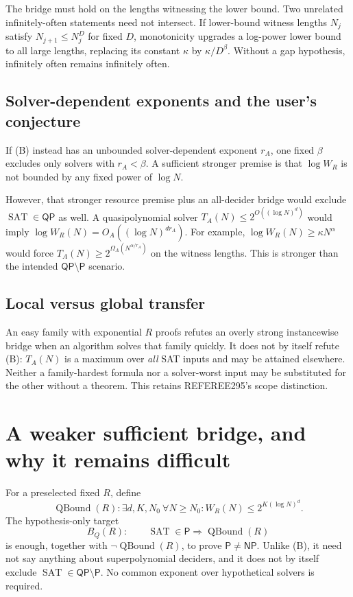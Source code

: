 \documentclass[11pt]{article}
\newcommand{\Pclass}{\mathsf P}
\newcommand{\NP}{\mathsf{NP}}
\newcommand{\QP}{\mathsf{QP}}
\newcommand{\SAT}{\operatorname{SAT}}
\begin{document}
The bridge must hold on the lengths witnessing the lower bound.
Two unrelated infinitely-often statements need not intersect. If lower-bound
witness lengths $N_j$ satisfy $N_{j+1}\le N_j^D$ for fixed $D$, monotonicity
upgrades a log-power lower bound to all large lengths, replacing its
constant $\kappa$ by $\kappa/D^\beta$. Without a gap hypothesis,
infinitely often remains infinitely often.

\subsection*{Solver-dependent exponents and the user's conjecture}
If (B) instead has an unbounded solver-dependent exponent $r_A$, one fixed
$\beta$ excludes only solvers with $r_A<\beta$.
A sufficient stronger premise is that $\log W_R$ is not bounded by any
fixed power of $\log N$.

However, that stronger resource premise plus an all-decider bridge would
exclude $\SAT\in\QP$ as well. A quasipolynomial solver
$T_A(N)\le2^{O((\log N)^d)}$ would imply
$\log W_R(N)=O_A((\log N)^{dr_A})$.
For example, $\log W_R(N)\ge\kappa N^\alpha$ would force
$T_A(N)\ge2^{\Omega_A(N^{\alpha/r_A})}$ on the witness lengths.
This is stronger than the intended $\QP\setminus\Pclass$ scenario.

\subsection*{Local versus global transfer}
An easy family with exponential $R$ proofs refutes an overly strong
instancewise bridge when an algorithm solves that family quickly.
It does not by itself refute (B): $T_A(N)$ is a maximum over \emph{all}
SAT inputs and may be attained elsewhere. Neither a family-hardest formula
nor a solver-worst input may be substituted for the other without a theorem.
This retains REFEREE295's scope distinction.

\section{A weaker sufficient bridge, and why it remains difficult}
For a preselected fixed $R$, define
\[
 \operatorname{QBound}(R):
 \exists d,K,N_0\ \forall N\ge N_0:
 W_R(N)\le2^{K(\log N)^d}.
\]
The hypothesis-only target
\[
 B_Q(R):\qquad
 \SAT\in\Pclass\Longrightarrow\operatorname{QBound}(R)
 \tag{12}
\]
is enough, together with $\neg\operatorname{QBound}(R)$, to prove
$\Pclass\ne\NP$. Unlike (B), it need not say anything about superpolynomial
deciders, and it does not by itself exclude $\SAT\in\QP\setminus\Pclass$.
No common exponent over hypothetical solvers is required.
\end{document}

